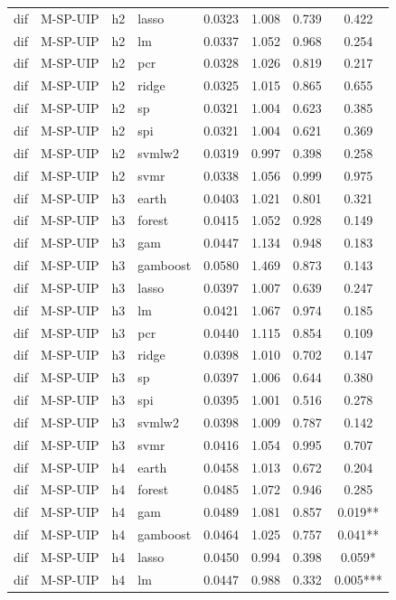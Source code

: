 \begin{ThreePartTable}
\begin{longtable}[t]{llclcccc}
dif & M-SP-UIP & h2 & lasso & 0.0323 & 1.008 & 0.739 & 0.422\\
dif & M-SP-UIP & h2 & lm & 0.0337 & 1.052 & 0.968 & 0.254\\
dif & M-SP-UIP & h2 & pcr & 0.0328 & 1.026 & 0.819 & 0.217\\
dif & M-SP-UIP & h2 & ridge & 0.0325 & 1.015 & 0.865 & 0.655\\
dif & M-SP-UIP & h2 & sp & 0.0321 & 1.004 & 0.623 & 0.385\\
dif & M-SP-UIP & h2 & spi & 0.0321 & 1.004 & 0.621 & 0.369\\
dif & M-SP-UIP & h2 & svmlw2 & 0.0319 & 0.997 & 0.398 & 0.258\\
dif & M-SP-UIP & h2 & svmr & 0.0338 & 1.056 & 0.999 & 0.975\\
\addlinespace
dif & M-SP-UIP & h3 & earth & 0.0403 & 1.021 & 0.801 & 0.321\\
dif & M-SP-UIP & h3 & forest & 0.0415 & 1.052 & 0.928 & 0.149\\
dif & M-SP-UIP & h3 & gam & 0.0447 & 1.134 & 0.948 & 0.183\\
dif & M-SP-UIP & h3 & gamboost & 0.0580 & 1.469 & 0.873 & 0.143\\
dif & M-SP-UIP & h3 & lasso & 0.0397 & 1.007 & 0.639 & 0.247\\
dif & M-SP-UIP & h3 & lm & 0.0421 & 1.067 & 0.974 & 0.185\\
dif & M-SP-UIP & h3 & pcr & 0.0440 & 1.115 & 0.854 & 0.109\\
dif & M-SP-UIP & h3 & ridge & 0.0398 & 1.010 & 0.702 & 0.147\\
dif & M-SP-UIP & h3 & sp & 0.0397 & 1.006 & 0.644 & 0.380\\
dif & M-SP-UIP & h3 & spi & 0.0395 & 1.001 & 0.516 & 0.278\\
dif & M-SP-UIP & h3 & svmlw2 & 0.0398 & 1.009 & 0.787 & 0.142\\
dif & M-SP-UIP & h3 & svmr & 0.0416 & 1.054 & 0.995 & 0.707\\
\addlinespace
dif & M-SP-UIP & h4 & earth & 0.0458 & 1.013 & 0.672 & 0.204\\
dif & M-SP-UIP & h4 & forest & 0.0485 & 1.072 & 0.946 & 0.285\\
dif & M-SP-UIP & h4 & gam & 0.0489 & 1.081 & 0.857 & 0.019**\\
dif & M-SP-UIP & h4 & gamboost & 0.0464 & 1.025 & 0.757 & 0.041**\\
dif & M-SP-UIP & h4 & lasso & 0.0450 & 0.994 & 0.398 & 0.059*\\
dif & M-SP-UIP & h4 & lm & 0.0447 & 0.988 & 0.332 & 0.005***\\

\end{longtable}
\end{ThreePartTable}

